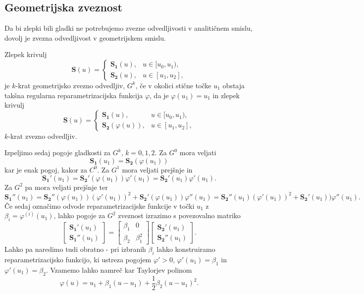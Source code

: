 \documentclass[isrm2, tisk]{fmfdelo}
\begin{document}
    \subsection{Geometrijska zveznost}
    Da bi zlepki bili gladki ne potrebujemo zvezne odvedljivosti v analitičnem smislu, dovolj je zvezna odvedljivost v geometrijskem smislu.
    \begin{definicija}
        \label{def:geometrijska-zveznost}
        Zlepek krivulj \[\mathbf{S}(u) = \begin{cases}
                                             \mathbf{S_1}(u), & u \in [u_0,u_1),  \\
                                             \mathbf{S_2}(u), & u \in [u_1,u_2],
        \end{cases}\] je $k$-krat geometrijsko zvezno odvedljiv, $G^k$, če v okolici stične točke $u_1$ obstaja takšna regularna reparametrizacijska funkcija $\varphi$, da je $\varphi(u_1)=u_1$ in zlepek krivulj
        \[\mathbf{S}(u) = \begin{cases}
                              \mathbf{S_1}(u), & u \in [u_0,u_1),  \\
                              \mathbf{S_2}(\varphi(u)), & u \in [u_1,u_2],
        \end{cases}\]
        $k$-krat zvezno odvedljiv.
    \end{definicija}
    \noindent Izpeljimo sedaj pogoje gladkosti za $G^k$, $k=0,1,2$.
    Za $G^0$ mora veljati \[\mathbf{S_1}(u_1) =  \mathbf{S_2}(\varphi(u_1))\] kar je enak pogoj, kakor za $C^0$.
    Za $G^1$ mora veljati prejšnje in \[ \mathbf{S_1'}(u_1) = \mathbf{S_2'}(\varphi(u_1))\varphi'(u_1) = \mathbf{S_2'}(u_1)\varphi'(u_1).\]
    Za $G^2$ pa mora veljati prejšnje ter \[\mathbf{S_1''}(u_1) = \mathbf{S_2''}(\varphi(u_1))(\varphi'(u_1))^2 +  \mathbf{S_2'}(\varphi(u_1))\varphi''(u_1) =\mathbf{S_2''}(u_1)(\varphi'(u_1))^2 +  \mathbf{S_2'}(u_1))\varphi''(u_1).\]
    Če sedaj označimo odvode reparametrizacijske funkcije v točki $u_1$ z $\beta_i = \varphi^{(i)}(u_1)$, lahko pogoje za $G^2$ zveznost izrazimo s povezovalno matriko
    \[
        \begin{bmatrix}
            \mathbf{S_1'}(u_1) \\
            \mathbf{S_1''}(u_1)
        \end{bmatrix}
        =
        \begin{bmatrix}
            \beta_1 & 0         \\
            \beta_2 & \beta_1^2
        \end{bmatrix}  \begin{bmatrix}
                           \mathbf{S_2'}(u_1) \\
                           \mathbf{S_2''}(u_1)
        \end{bmatrix}.\]
    Lahko pa naredimo tudi obratno - pri izbranih $\beta_i$ lahko konstruiramo reparametrizacijsko funkcijo, ki ustreza pogojem $\varphi'>0$,  $\varphi'(u_1)=\beta_1$ in $\varphi'(u_1)=\beta_2$. Vzamemo lahko namreč kar Taylorjev polinom
    \[\varphi(u) = u_1 + \beta_1(u-u_1) + \frac{1}{2}\beta_2(u-u_1)^2.\]
\end{document}
